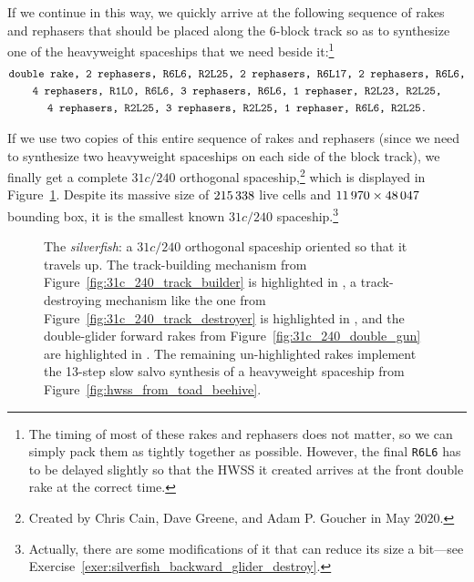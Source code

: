 If we continue in this way, we quickly arrive at the following sequence of rakes and rephasers that should be placed along the $6$-block track so as to synthesize one of the heavyweight spaceships that we need beside it:\footnote{The timing of most of these rakes and rephasers does not matter, so we can simply pack them as tightly together as possible. However, the final \texttt{R6L6} has to be delayed slightly so that the HWSS it created arrives at the front double rake at the correct time.}\label{page:silverfish_rake_seq}
\begin{gather*}
	\text{\texttt{double rake, 2 rephasers, R6L6, R2L25, 2 rephasers, R6L17, 2 rephasers, R6L6,}} \\
	\text{\texttt{4 rephasers, R1L0, R6L6, 3 rephasers, R6L6, 1 rephaser, R2L23, R2L25,}} \\
	\text{\texttt{4 rephasers, R2L25, 3 rephasers, R2L25, 1 rephaser, R6L6, R2L25.}}
\end{gather*}

If we use two copies of this entire sequence of rakes and rephasers (since we need to synthesize two heavyweight spaceships on each side of the block track), we finally get a complete $31c/240$ orthogonal spaceship,\footnote{Created by Chris Cain, Dave Greene, and Adam P. Goucher in May 2020.} which is displayed in Figure~\ref{fig:silverfish}. Despite its massive size of $215{\,}338$ live cells and $11{\,}970 \times 48{\,}047$ bounding box, it is the smallest known $31c/240$ spaceship.\footnote{Actually, there are some modifications of it that can reduce its size a bit---see Exercise~\ref{exer:silverfish_backward_glider_destroy}.}

\begin{figure}[!htbp]
	\centering
	\caption{The \emph{silverfish}: a $31c/240$ orthogonal spaceship oriented so that it travels up. The track-building mechanism from Figure~\ref{fig:31c_240_track_builder} is highlighted in , a track-destroying mechanism like the one from Figure~\ref{fig:31c_240_track_destroyer} is highlighted in , and the double-glider forward rakes from Figure~\ref{fig:31c_240_double_gun} are highlighted in . The remaining un-highlighted rakes implement the 13-step slow salvo synthesis of a heavyweight spaceship from Figure~\ref{fig:hwss_from_toad_beehive}.}\label{fig:silverfish}
\end{figure}


